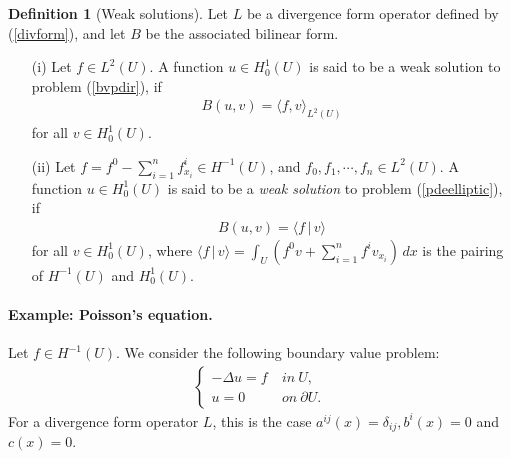 \documentclass{article}
\numberwithin{equation}{section}
\theoremstyle{plain}
\theoremstyle{definition}
\newtheorem{definition}[theorem]{Definition}
\begin{document}
\begin{definition}[Weak solutions]\label{weaksolelliptic}
Let $L$ be a divergence form operator defined by (\ref{divform}), and let $B$ be the associated bilinear form.
\begin{itemize}
\item[(i)] Let $f\in L^2(U)$. A function $u\in H_0^1(U)$ is said to be a weak solution to problem (\ref{bvpdir}), if
\begin{align*}
	B(u,v)=\langle f,v\rangle_{L^2(U)}
\end{align*}
for all $v\in H_0^1(U)$.
\item[(ii)] Let $f=f^0-\sum_{i=1}^n f^i_{x_i}\in H^{-1}(U)$, and $f_0,f_1,\cdots,f_n\in L^2(U)$. A function $u\in H_0^1(U)$ is said to be a \textit{weak solution} to problem (\ref{pdeelliptic}), if
\begin{align*}
	B(u,v)=\langle f\,|\,v\rangle
\end{align*}
for all $v\in H_0^1(U)$, where $\langle f\,|\,v\rangle=\int_U(f^0v+\sum_{i=1}^nf^iv_{x_i})\,dx$ is the pairing of $H^{-1}(U)$ and $H_0^1(U)$.
\end{itemize}
\end{definition}

\paragraph{Example: Poisson's equation.} Let $f\in H^{-1}(U)$. We consider the following boundary value problem:
\begin{align*}
\begin{cases}
	-\Delta u=f\ &in\ U,\\
	u=0\ &on\ \partial U.
\end{cases}
\end{align*}
For a divergence form operator $L$, this is the case $a^{ij}(x)=\delta_{ij}, b^i(x)=0$ and $c(x)=0$.
\end{document}
